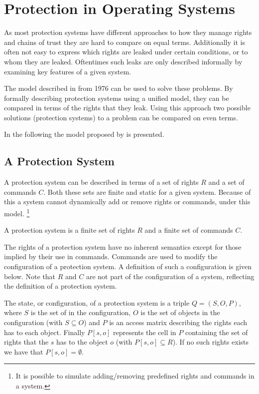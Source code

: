 \section{Protection in Operating Systems}
As most protection systems have different approaches to how they manage rights and chains of trust they are hard to compare on equal terms.
Additionally it is often not easy to express which rights are leaked under certain conditions, or to whom they are leaked.
Oftentimes such leaks are only described informally by examining key features of a given system.

The model described in \citet{HRU} from 1976 can be used to solve these problems.
By formally describing protection systems using a unified model, they can be compared in terms of the rights that they leak.
Using this approach two possible solutions (protection systems) to a problem can be compared on even terms.

In the following the model proposed by \citet{HRU} is presented.

\subsection{A Protection System}
A protection system can be described in terms of a set of rights $R$ and a set of commands $C$.
Both these sets are finite and static for a given system.
Because of this a system cannot dynamically add or remove rights or commands, under this model.
\footnote{It is possible to simulate adding/removing predefined rights and commands in a system.}

\begin{definition}
  A protection system is a finite set of rights $R$ and a finite set of commands $C$.
\end{definition}

The rights of a protection system have no inherent semantics except for those implied by their use in commands.
Commands are used to modify the configuration of a protection system.
A definition of such a configuration is given below.
Note that $R$ and $C$ are not part of the configuration of a system, reflecting the definition of a protection system.

\begin{definition}\label{protection:def:state}
The state, or configuration, of a protection system is a triple $Q = (S, O, P)$, where $S$ is the set of \subjects{} in the configuration, $O$ is the set of objects in the configuration (with $S \subseteq O$) and $P$ is an access matrix describing the rights each \ssubject{} has to each object.
Finally $P[s, o]$ represents the cell in $P$ containing the set of rights that the \ssubject{} $s$ has to the object $o$ (with $P[s, o] \subseteq R$).
If no such rights exists we have that $P[s,o] = \emptyset$.
\end{definition}

